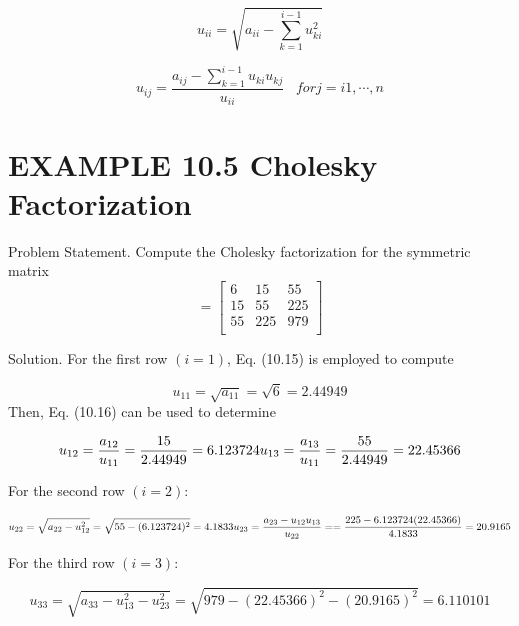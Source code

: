 \documentclass[../main.tex]{subfiles}
\begin{document}
\begin{equation}
u_{ii}=\sqrt{a_{ii}-\sum_{k=1}^{i-1}u_{ki}^{2}}
\tag{10.15}
\end{equation}

\begin{equation}
u_{ij}=\frac{a_{ij}-\sum_{k=1}^{i-1}u_{ki}u_{kj}}{u_{ii}}
\;\;\; for j=i1,\cdots,n
\tag{10.16}
\end{equation}

\section*{EXAMPLE 10.5 Cholesky Factorization}

Problem Statement. Compute the Cholesky factorization for the symmetric matrix
\begin{equation}
[A]=
\begin{bmatrix}
 6& 15& 55\\ 
15& 55& 225\\ 
55& 225& 979 \\ 
\end{bmatrix}
\end{equation}

Solution. For the first row $(i = 1)$, Eq. (10.15) is employed to compute

\begin{equation}
u_{11} = \sqrt{a_{11}} = \sqrt{6} = 2.44949
\end{equation}
Then, Eq. (10.16) can be used to determine

\begin{equation}
u_{12} = \frac{a_{12}}{u_{11}}
= \frac{15}{2.44949} = 6.123724 \\
u_{13} = \frac{a_{13}}{u_{11}}
= \frac{55}{2.44949} = 22.45366
\end{equation}

For the second row $(i = 2)$:

\begin{equation}
u_{22} = \sqrt{a_{22} - u_{12}^{2}} =
\sqrt{55 - (6.123724)^{2}} = 4.1833\\
u_{23} = \frac{a_{23} - u_{12}u_{13}}{u_{22}} =
= \frac{225 - 6.123724(22.45366)}{4.1833} = 20.9165
\end{equation}

For the third row $(i = 3)$:

\begin{equation}
u_{33} = \sqrt{a_{33} - u_{13}^{2} - u_{23}^{2}} =
\sqrt{979 - (22.45366)^{2} - (20.9165)^{2}} = 6.110101
\end{equation}
\end{document}
